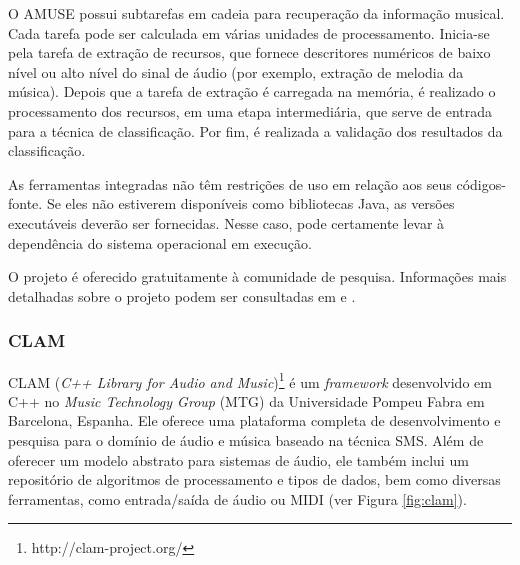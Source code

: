 O AMUSE possui subtarefas em cadeia para recuperação da informação musical. Cada tarefa pode ser calculada em várias unidades de processamento. Inicia-se pela tarefa de extração de recursos, que fornece descritores numéricos de baixo nível ou alto nível do sinal de áudio (por exemplo, extração de melodia da música). Depois que a tarefa de extração é carregada na memória, é realizado o processamento dos recursos, em uma etapa intermediária, que serve de entrada para a técnica de classificação. Por fim, é realizada a validação dos resultados da classificação. 

As ferramentas integradas não têm restrições de uso em relação aos seus códigos-fonte. Se eles não estiverem disponíveis como bibliotecas Java, as versões executáveis deverão ser fornecidas. Nesse caso, pode certamente levar à dependência do sistema operacional em execução.

O projeto é oferecido gratuitamente à comunidade de pesquisa. Informações mais detalhadas sobre o projeto podem ser consultadas em \cite{vatolkin2010} e \cite{amuse}.

\subsubsection{CLAM} \label{subsec:clam}
CLAM (\textit{C++ Library for Audio and Music})\footnote{http://clam-project.org/} é um \textit{framework} desenvolvido em C++ no \textit{Music Technology Group} (MTG) da Universidade Pompeu Fabra em Barcelona, Espanha. Ele oferece uma plataforma completa de desenvolvimento e pesquisa para o domínio de áudio e música baseado na técnica SMS. Além de oferecer um modelo abstrato para sistemas de áudio, ele também inclui um repositório de algoritmos de processamento e tipos de dados, bem como diversas ferramentas, como entrada/saída de áudio ou MIDI (ver Figura \ref{fig:clam}).

